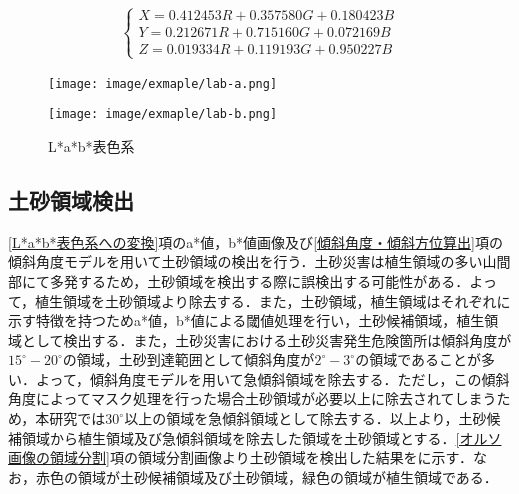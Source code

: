       \begin{eqnarray}
        \label{XYZ表色系}
        \left\{
          \begin{array}{l}
            X = 0.412453R + 0.357580G + 0.180423B \\
            Y = 0.212671R + 0.715160G + 0.072169B \\
            Z = 0.019334R + 0.119193G + 0.950227B
          \end{array}
        \right.
      \end{eqnarray}

      \begin{figure}[t]
        \begin{minipage}[c]{0.45\hsize}
          \centering
          \texttt{[image: image/exmaple/lab-a.png]}
        \end{minipage}
        \begin{minipage}[c]{0.45\hsize}
          \centering
          \texttt{[image: image/exmaple/lab-b.png]}
        \end{minipage}
        \caption{L*a*b*表色系}
        \label{Lab画像}
      \end{figure}


    \subsection{土砂領域検出}
      \label{土砂領域検出}
      \ref{L*a*b*表色系への変換}項のa*値，b*値画像及び\ref{傾斜角度・傾斜方位算出}項の傾斜角度モデルを用いて土砂領域の検出を行う．土砂災害は植生領域の多い山間部にて多発するため，土砂領域を検出する際に誤検出する可能性がある．よって，植生領域を土砂領域より除去する．また，土砂領域，植生領域はそれぞれに示す特徴を持つためa*値，b*値による閾値処理を行い，土砂候補領域，植生領域として検出する．また，土砂災害における土砂災害発生危険箇所は傾斜角度が$15^{\circ} - 20^{\circ}$の領域，土砂到達範囲として傾斜角度が$2^{\circ} - 3^{\circ}$の領域であることが多い\cite{土砂災害発生範囲}．よって，傾斜角度モデルを用いて急傾斜領域を除去する．ただし，この傾斜角度によってマスク処理を行った場合土砂領域が必要以上に除去されてしまうため，本研究では$30^{\circ}$以上の領域を急傾斜領域として除去する．以上より，土砂候補領域から植生領域及び急傾斜領域を除去した領域を土砂領域とする．\ref{オルソ画像の領域分割}項の領域分割画像より土砂領域を検出した結果をに示す．なお，赤色の領域が土砂候補領域及び土砂領域，緑色の領域が植生領域である．

